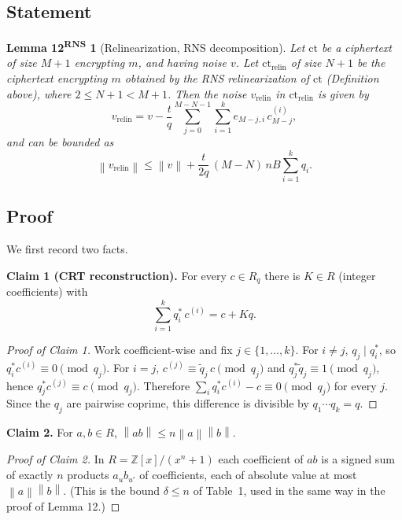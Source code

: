 \documentclass[11pt]{article}
\newcommand{\norm}[1]{\left\lVert #1\right\rVert}
\newcommand{\ct}{\mathrm{ct}}
\newcommand{\ctrelin}{\mathrm{ct}_{\mathrm{relin}}}
\newcommand{\vrelin}{v_{\mathrm{relin}}}
\newcommand{\qstar}[1]{q^{*}_{#1}}
\newcommand{\qtilde}[1]{\tilde{q}_{#1}}
\theoremstyle{plain}
\newtheorem*{lemmaRNS}{Lemma 12\textsuperscript{RNS}}
\theoremstyle{definition}
\theoremstyle{remark}
\begin{document}
\subsection{Statement}

\begin{lemmaRNS}[Relinearization, RNS decomposition]
Let $\ct$ be a ciphertext of size $M+1$ encrypting $m$, and having noise $v$. Let $\ctrelin$
of size $N+1$ be the ciphertext encrypting $m$ obtained by the RNS relinearization of $\ct$
(Definition above), where $2\leq N+1<M+1$. Then the noise $\vrelin$ in $\ctrelin$ is given by
\[
 \vrelin=v-\frac{t}{q}\sum_{j=0}^{M-N-1}\sum_{i=1}^{k}e_{M-j,i}\,c_{M-j}^{(i)},
\]
and can be bounded as
\[
 \norm{\vrelin}\leq\norm{v}+\frac{t}{2q}\,(M-N)\,nB\sum_{i=1}^{k}q_i .
\]
\end{lemmaRNS}

\subsection{Proof}

We first record two facts.

\textbf{Claim 1 (CRT reconstruction).} For every $c\in R_q$ there is $K\in R$ (integer coefficients) with
\[
 \sum_{i=1}^{k}\qstar{i}\,c^{(i)}=c+Kq .
\]
\begin{proof}[Proof of Claim 1]
Work coefficient-wise and fix $j\in\{1,\dots,k\}$. For $i\neq j$, $q_j\mid\qstar{i}$, so
$\qstar{i}c^{(i)}\equiv0\pmod{q_j}$. For $i=j$, $c^{(j)}\equiv\qtilde{j}\,c\pmod{q_j}$ and
$\qstar{j}\qtilde{j}\equiv1\pmod{q_j}$, hence $\qstar{j}c^{(j)}\equiv c\pmod{q_j}$. Therefore
$\sum_i\qstar{i}c^{(i)}-c\equiv0\pmod{q_j}$ for every $j$. Since the $q_j$ are pairwise coprime,
this difference is divisible by $q_1\cdots q_k=q$.
\end{proof}

\textbf{Claim 2.} For $a,b\in R$, $\norm{ab}\leq n\norm{a}\norm{b}$.
\begin{proof}[Proof of Claim 2]
In $R=\mathbb{Z}[x]/(x^n+1)$ each coefficient of $ab$ is a signed sum of exactly $n$ products
$a_ub_{u'}$ of coefficients, each of absolute value at most $\norm{a}\norm{b}$. (This is the
bound $\delta\leq n$ of Table~1, used in the same way in the proof of Lemma 12.)
\end{proof}
\end{document}
